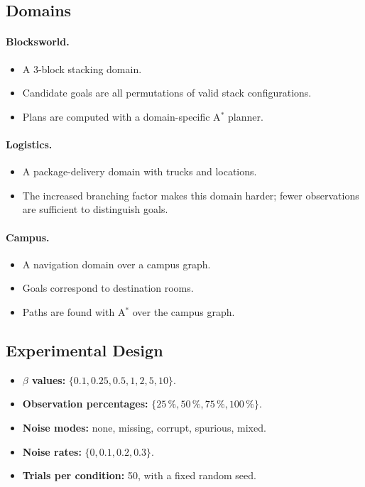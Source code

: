\documentclass[11pt,a4paper]{article}
\begin{document}
\subsection{Domains}

\paragraph{Blocksworld.} 
\begin{itemize}
    \item A 3-block stacking domain.  \item Candidate goals are all
permutations of valid stack configurations.  
\item Plans are computed with a
domain-specific A$^*$ planner. 
\end{itemize} 

\paragraph{Logistics.}  
\begin{itemize}
\item A package-delivery domain with trucks and locations.
\item The increased branching factor makes this domain harder; fewer observations
are sufficient to distinguish goals.
\end{itemize}


\paragraph{Campus.} 
\begin{itemize}
\item A navigation domain over a campus graph.  
\item Goals correspond
to destination rooms.
\item Paths are found with A$^*$ over the campus graph.
\end{itemize}


\subsection{Experimental Design}

\begin{itemize}
  \item \textbf{$\beta$ values:} $\{0.1, 0.25, 0.5, 1, 2, 5, 10\}$.
  \item \textbf{Observation percentages:} $\{25\,\%, 50\,\%, 75\,\%, 100\,\%\}$.
  \item \textbf{Noise modes:} none, missing, corrupt, spurious, mixed.
  \item \textbf{Noise rates:} $\{0, 0.1, 0.2, 0.3\}$.
  \item \textbf{Trials per condition:} 50, with a fixed random seed.
\end{itemize}
\end{document}
